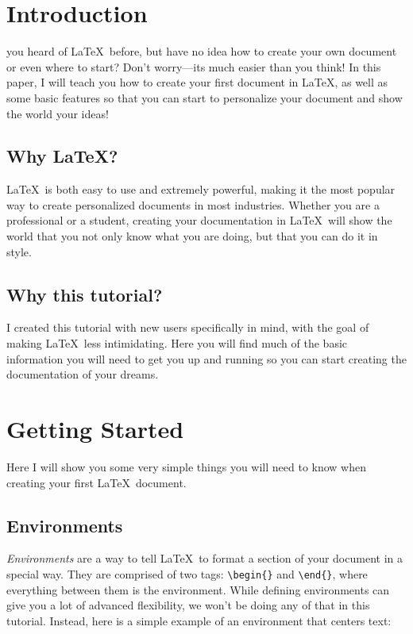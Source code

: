 \documentclass[10pt,final,journal,compsoc]{IEEEtran}
\begin{document}

\section{Introduction}

 you heard of \LaTeX\ before, but have no idea how to create your own document or even where to start? Don't worry---its much easier than you think! In this paper, I will teach you how to create your first document in \LaTeX, as well as some basic features so that you can start to personalize your document and show the world your ideas!
\subsection{Why \LaTeX?}
\LaTeX\ is both easy to use and extremely powerful, making it the most popular way to create personalized documents in most industries. Whether you are a professional or a student, creating your documentation in \LaTeX\ will show the world that you not only know what you are doing, but that you can do it in style.


\subsection{Why this tutorial?}
I created this tutorial with new users specifically in mind, with the goal of making \LaTeX\ less intimidating. Here you will find much of the basic information you will need to get you up and running so you can start creating the documentation of your dreams.




\section{Getting Started}
Here I will show you some very simple things you will need to know when creating your first \LaTeX\ document.

\subsection{Environments}
\textit{Environments} are a way to tell \LaTeX\ to format a section of your document in a special way. They are comprised of two tags: \verb|\begin{}| and \verb|\end{}|, where everything between them is the environment. While defining environments can give you a lot of advanced flexibility, we won't be doing any of that in this tutorial. Instead, here is a simple example of an environment that centers text:
\end{document}
